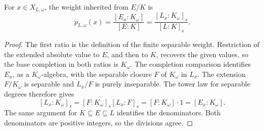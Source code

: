 \begin{lemma}
\label{lem:finite-separable-weight}
\leanok
{}
For $x\in X_{L,\omega}$, the weight inherited from $E/K$ is
\[
 p_{L,\omega}(x)
 =\frac{[E_x:K_\omega]}{[E:K]}
 =\frac{[L_x:K_\omega]_s}{[L:K]_s}.
\]
\end{lemma}
\begin{proof}
The first ratio is the definition of the finite separable weight.
Restriction of the extended absolute value to $E$, and then to $K$,
recovers the given values, so the base completion in both ratios is
$K_\omega$.
The completion comparison identifies $E_x$, as a $K_\omega$-algebra,
with the separable closure $F$ of $K_\omega$ in $L_x$. The extension
$F/K_\omega$ is separable and $L_x/F$ is purely inseparable. The
tower law for separable degrees therefore gives
\[
 [L_x:K_\omega]_s=[F:K_\omega]_s[L_x:F]_s
 =[F:K_\omega]\cdot1=[E_x:K_\omega].
\]
The same argument for $K\subseteq E\subseteq L$ identifies the denominators.
Both denominators are positive integers, so the divisions agree.
\end{proof}

